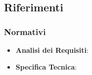 	\subsection{Riferimenti} %
	\label{sub:riferimenti}


		\subsubsection{Normativi} %
		\label{ssub:normativi}
			\begin{itemize}
				\item \textbf{Analisi dei Requisiti}: \docNameVersionAdR
				\item \textbf{Specifica Tecnica}: \docNameVersionST
			\end{itemize}



